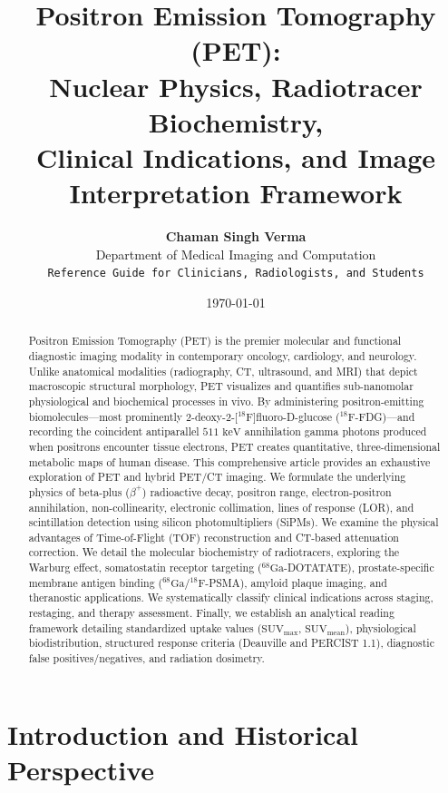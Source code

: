 \documentclass[11pt,a4paper]{article}
\title{\textbf{\huge Positron Emission Tomography (PET):}\\[0.3em]
\Large Nuclear Physics, Radiotracer Biochemistry,\\
Clinical Indications, and Image Interpretation Framework}
\author{\textbf{Chaman Singh Verma}\\[0.2em]
\small Department of Medical Imaging and Computation\\
\small \texttt{Reference Guide for Clinicians, Radiologists, and Students}}
\date{\today}
\begin{document}
\maketitle

\begin{abstract}
Positron Emission Tomography (PET) is the premier molecular and functional diagnostic imaging modality in contemporary oncology, cardiology, and neurology. Unlike anatomical modalities (radiography, CT, ultrasound, and MRI) that depict macroscopic structural morphology, PET visualizes and quantifies sub-nanomolar physiological and biochemical processes in vivo. By administering positron-emitting biomolecules—most prominently 2-deoxy-2-[$^{18}\text{F}$]fluoro-D-glucose ($^{18}\text{F}$-FDG)—and recording the coincident antiparallel $511\text{ keV}$ annihilation gamma photons produced when positrons encounter tissue electrons, PET creates quantitative, three-dimensional metabolic maps of human disease. This comprehensive article provides an exhaustive exploration of PET and hybrid PET/CT imaging. We formulate the underlying physics of beta-plus ($\beta^+$) radioactive decay, positron range, electron-positron annihilation, non-collinearity, electronic collimation, lines of response (LOR), and scintillation detection using silicon photomultipliers (SiPMs). We examine the physical advantages of Time-of-Flight (TOF) reconstruction and CT-based attenuation correction. We detail the molecular biochemistry of radiotracers, exploring the Warburg effect, somatostatin receptor targeting ($^{68}\text{Ga}$-DOTATATE), prostate-specific membrane antigen binding ($^{68}\text{Ga}$/$^{18}\text{F}$-PSMA), amyloid plaque imaging, and theranostic applications. We systematically classify clinical indications across staging, restaging, and therapy assessment. Finally, we establish an analytical reading framework detailing standardized uptake values ($\text{SUV}_{\max}$, $\text{SUV}_{\text{mean}}$), physiological biodistribution, structured response criteria (Deauville and PERCIST 1.1), diagnostic false positives/negatives, and radiation dosimetry.
\end{abstract}

\tableofcontents
\newpage

\section{Introduction and Historical Perspective}
\end{document}
